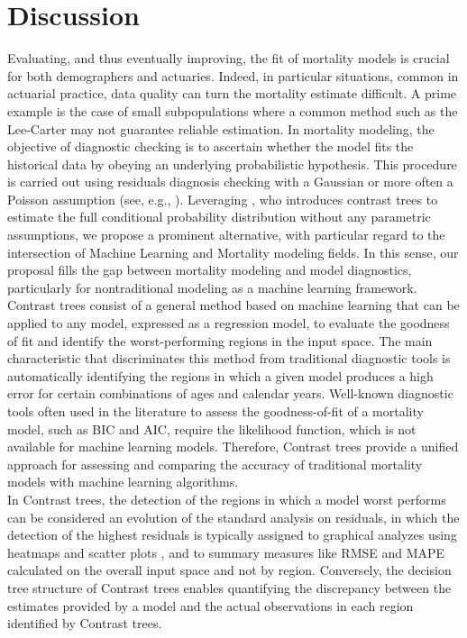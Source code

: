 \documentclass[a4,11pt]{article}
\begin{document}

\section{Discussion}
Evaluating, and thus eventually improving, the fit of mortality models is crucial for both demographers and actuaries. 
Indeed, in particular situations, common in actuarial practice, data quality can turn the mortality estimate difficult. 
A prime example is the case of small subpopulations where a common method such as the Lee-Carter may not guarantee reliable estimation. 
In mortality modeling, the objective of diagnostic checking is to ascertain whether the model fits the historical data by obeying an underlying probabilistic hypothesis.  This procedure is carried out using residuals diagnosis checking with a Gaussian or more often a Poisson assumption (see, e.g., \cite{RH}).
Leveraging \cite{Friedman2020}, who introduces contrast trees to estimate the full conditional probability distribution without any parametric assumptions, we propose a prominent alternative, with particular regard to the intersection of Machine Learning and Mortality modeling fields.
In this sense, our proposal fills the gap between mortality modeling and model diagnostics, particularly for nontraditional modeling as a machine learning framework.\\
Contrast trees consist of a general method based on machine learning that can be applied to any model, expressed as a regression model, to evaluate the goodness of fit and identify the worst-performing regions in the input space. The main characteristic that discriminates this method from traditional diagnostic tools is automatically identifying the regions in which a given model produces a high error for certain combinations of ages and calendar years.
Well-known diagnostic tools often used in the literature to assess the goodness-of-fit of a mortality model, such as BIC and AIC, require the likelihood function, which is not available for machine learning models. Therefore, Contrast trees provide a unified approach for assessing and comparing the accuracy of traditional mortality models with machine learning algorithms.\\
In Contrast trees, the detection of the regions in which a model worst performs can be considered an evolution of the standard analysis on residuals, in which the detection of the highest residuals is typically assigned to graphical analyzes using heatmaps and scatter plots \cite{CBD09,Villegas2018}, and to summary measures like RMSE and MAPE calculated on the overall input space and not by region.
Conversely, the decision tree structure of Contrast trees enables quantifying the discrepancy between the estimates provided by a model and the actual observations in each region identified by Contrast trees.
\end{document}
